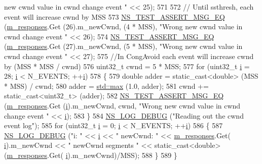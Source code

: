 \begin{DoxyCode}
{       new cwnd value in cwnd change event "} << 25);  
571   
572   \textcolor{comment}{// Until ssthresh, each event will increase cwnd by MSS}
573   \hyperlink{group__testing_ga2a9d78cffb3db8e867c35fff0b698cf5}{NS\_TEST\_ASSERT\_MSG\_EQ} (\hyperlink{classNs3TcpCwndTestCase2_ab2e45e18596ca237cd979daccdcf65b2}{m\_responses}.Get (26).m\_newCwnd, (4 * MSS), \textcolor{stringliteral}{"Wrong
       new cwnd value in cwnd change event "} << 26); 
574   \hyperlink{group__testing_ga2a9d78cffb3db8e867c35fff0b698cf5}{NS\_TEST\_ASSERT\_MSG\_EQ} (\hyperlink{classNs3TcpCwndTestCase2_ab2e45e18596ca237cd979daccdcf65b2}{m\_responses}.Get (27).m\_newCwnd, (5 * MSS), \textcolor{stringliteral}{"Wrong
       new cwnd value in cwnd change event "} << 27); 
575   \textcolor{comment}{//In CongAvoid each event will increase cwnd by (MSS * MSS / cwnd)}
576   uint32\_t cwnd = 5 * MSS;
577   \textcolor{keywordflow}{for} (uint32\_t \hyperlink{bernuolliDistribution_8m_a6f6ccfcf58b31cb6412107d9d5281426}{i} = 28; \hyperlink{bernuolliDistribution_8m_a6f6ccfcf58b31cb6412107d9d5281426}{i} < N\_EVENTS; ++\hyperlink{bernuolliDistribution_8m_a6f6ccfcf58b31cb6412107d9d5281426}{i})
578     \{
579       \textcolor{keywordtype}{double} adder = \textcolor{keyword}{static\_cast<}\textcolor{keywordtype}{double}\textcolor{keyword}{>} (MSS * MSS) / cwnd;
580       adder = \hyperlink{80211b_8c_affe776513b24d84b39af8ab0930fef7f}{std::max} (1.0, adder);
581       cwnd += \textcolor{keyword}{static\_cast<}uint32\_t\textcolor{keyword}{>} (adder);    
582       \hyperlink{group__testing_ga2a9d78cffb3db8e867c35fff0b698cf5}{NS\_TEST\_ASSERT\_MSG\_EQ} (\hyperlink{classNs3TcpCwndTestCase2_ab2e45e18596ca237cd979daccdcf65b2}{m\_responses}.Get (\hyperlink{bernuolliDistribution_8m_a6f6ccfcf58b31cb6412107d9d5281426}{i}).m\_newCwnd, cwnd, \textcolor{stringliteral}{"Wrong
       new cwnd value in cwnd change event "} << \hyperlink{bernuolliDistribution_8m_a6f6ccfcf58b31cb6412107d9d5281426}{i}); 
583     \}
584   \hyperlink{group__logging_ga413f1886406d49f59a6a0a89b77b4d0a}{NS\_LOG\_DEBUG} (\textcolor{stringliteral}{"Reading out the cwnd event log"});  
585   \textcolor{keywordflow}{for} (uint32\_t \hyperlink{bernuolliDistribution_8m_a6f6ccfcf58b31cb6412107d9d5281426}{i} = 0; \hyperlink{bernuolliDistribution_8m_a6f6ccfcf58b31cb6412107d9d5281426}{i} < N\_EVENTS; ++\hyperlink{bernuolliDistribution_8m_a6f6ccfcf58b31cb6412107d9d5281426}{i})
586   \{
587     \hyperlink{group__logging_ga413f1886406d49f59a6a0a89b77b4d0a}{NS\_LOG\_DEBUG} (\textcolor{stringliteral}{"i: "} << \hyperlink{bernuolliDistribution_8m_a6f6ccfcf58b31cb6412107d9d5281426}{i} << \textcolor{stringliteral}{" newCwnd: "} << \hyperlink{classNs3TcpCwndTestCase2_ab2e45e18596ca237cd979daccdcf65b2}{m\_responses}.Get(
      \hyperlink{bernuolliDistribution_8m_a6f6ccfcf58b31cb6412107d9d5281426}{i}).m\_newCwnd << \textcolor{stringliteral}{" newCwnd segments "} << \textcolor{keyword}{static\_cast<}\textcolor{keywordtype}{double}\textcolor{keyword}{>} (\hyperlink{classNs3TcpCwndTestCase2_ab2e45e18596ca237cd979daccdcf65b2}{m\_responses}.Get(
      \hyperlink{bernuolliDistribution_8m_a6f6ccfcf58b31cb6412107d9d5281426}{i}).m\_newCwnd)/MSS);
588   \}
589 \}
\end{DoxyCode}


